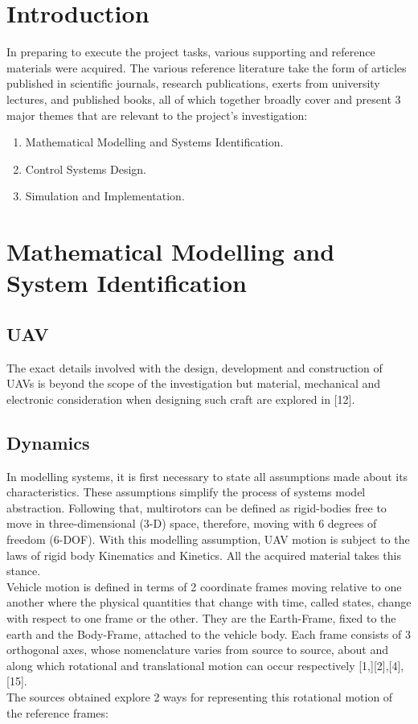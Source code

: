 \documentclass[12pt,a4paper,twoside]{report}
\begin{document}
		\section{Introduction}
		
			In preparing to execute the project tasks, various supporting and reference materials were acquired. The various reference literature take the form of articles published in scientific journals, research publications, exerts from university lectures, and published books, all of which together broadly cover and present 3 major themes that are relevant to the project’s investigation:
		
			\begin{enumerate}
				\item 
					Mathematical Modelling and Systems Identification. 
				\item 
					Control Systems Design.
				\item 
					Simulation and Implementation.
			\end{enumerate}
		
		\section{Mathematical Modelling and System Identification}
			
			\subsection{UAV}
				
				The exact details involved with the design, development and construction of UAVs is beyond the scope of the investigation but material, mechanical and electronic consideration when designing such craft are explored in [12].
				
			\subsection{Dynamics}
			
				In modelling systems, it is first necessary to state all assumptions made about its characteristics. These assumptions simplify the process of systems model abstraction. Following that, multirotors can be defined as rigid-bodies free to move in three-dimensional (3-D) space, therefore, moving with 6 degrees of freedom (6-DOF). With this modelling assumption, UAV motion is subject to the laws of rigid body Kinematics and Kinetics. All the acquired material takes this stance. 
				\\
				Vehicle motion is defined in terms of 2 coordinate frames moving relative to one another where the physical quantities that change with time, called states, change with respect to one frame or the other. They are the Earth-Frame, fixed to the earth and the Body-Frame, attached to the vehicle body. Each frame consists of 3 orthogonal axes, whose nomenclature varies from source to source, about and along which rotational and translational motion can occur respectively [1,][2],[4],[15]. 
				\\
				The sources obtained explore 2 ways for representing this rotational motion of the reference frames:
				
\end{document}

